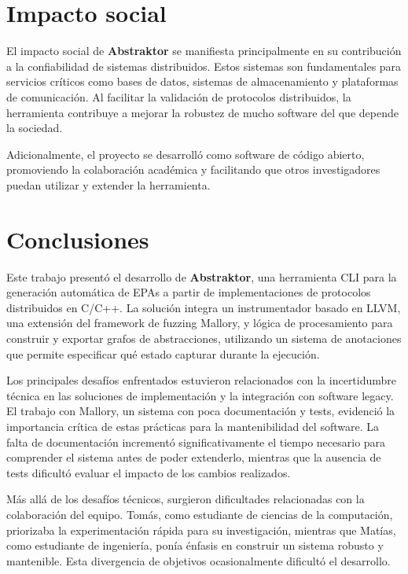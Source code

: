 \documentclass[12pt]{article}
\begin{document}
\section{Impacto social}

El impacto social de \textbf{Abstraktor} se manifiesta principalmente en su contribución a la confiabilidad de sistemas distribuidos. Estos sistemas son fundamentales para servicios críticos como bases de datos, sistemas de almacenamiento y plataformas de comunicación. Al facilitar la validación de protocolos distribuidos, la herramienta contribuye a mejorar la robustez de mucho software del que depende la sociedad.

Adicionalmente, el proyecto se desarrolló como software de código abierto, promoviendo la colaboración académica y facilitando que otros investigadores puedan utilizar y extender la herramienta.

\section{Conclusiones}

Este trabajo presentó el desarrollo de \textbf{Abstraktor}, una herramienta CLI para la generación automática de EPAs a partir de implementaciones de protocolos distribuidos en C/C++. La solución integra un instrumentador basado en LLVM, una extensión del framework de fuzzing Mallory, y lógica de procesamiento para construir y exportar grafos de abstracciones, utilizando un sistema de anotaciones que permite especificar qué estado capturar durante la ejecución.

Los principales desafíos enfrentados estuvieron relacionados con la incertidumbre técnica en las soluciones de implementación y la integración con software legacy. El trabajo con Mallory, un sistema con poca documentación y tests, evidenció la importancia crítica de estas prácticas para la mantenibilidad del software. La falta de documentación incrementó significativamente el tiempo necesario para comprender el sistema antes de poder extenderlo, mientras que la ausencia de tests dificultó evaluar el impacto de los cambios realizados.

Más allá de los desafíos técnicos, surgieron dificultades relacionadas con la colaboración del equipo. Tomás, como estudiante de ciencias de la computación, priorizaba la experimentación rápida para su investigación, mientras que Matías, como estudiante de ingeniería, ponía énfasis en construir un sistema robusto y mantenible. Esta divergencia de objetivos ocasionalmente dificultó el desarrollo.
\end{document}
